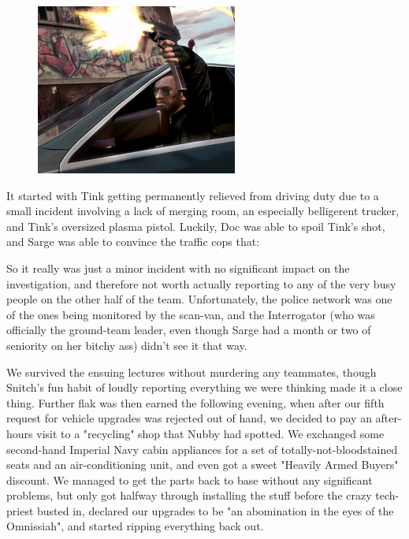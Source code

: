 \begin{figure}
	\begin{center}
		\includegraphics[width=\figwidth]{pics/17/33.png}
	\end{center}
\end{figure}
It started with Tink getting permanently relieved from driving duty due to a small incident involving a lack of merging room, an especially belligerent trucker, and Tink's oversized plasma pistol. 
Luckily, Doc was able to spoil Tink's shot, and Sarge was able to convince the traffic cops that:




So it really was just a minor incident with no significant impact on the investigation, and therefore not worth actually reporting to any of the very busy people on the other half of the team. 
Unfortunately, the police network was one of the ones being monitored by the scan-van, and the Interrogator (who was officially the ground-team leader, even though Sarge had a month or two of seniority on her bitchy ass) didn't see it that way. 


We survived the ensuing lectures without murdering any teammates, though Snitch's fun habit of loudly reporting everything we were thinking made it a close thing. 
Further flak was then earned the following evening, when after our fifth request for vehicle upgrades was rejected out of hand, we decided to pay an after-hours visit to a "recycling" shop that Nubby had spotted. 
We exchanged some second-hand Imperial Navy cabin appliances for a set of totally-not-bloodstained seats and an air-conditioning unit, and even got a sweet "Heavily Armed Buyers" discount. 
We managed to get the parts back to base without any significant problems, but only got halfway through installing the stuff before the crazy tech-priest busted in, declared our upgrades to be "an abomination in the eyes of the Omnissiah", and started ripping everything back out. 


